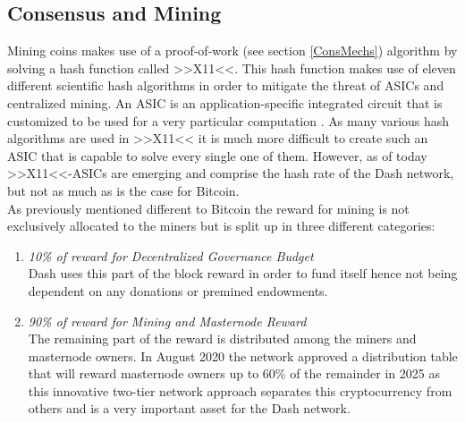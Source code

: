 \documentclass[a4paper,12pt]{report}
\begin{document}
	    \subsection{Consensus and Mining}
	    \startsubsection
	        Mining coins makes use of a proof-of-work (see section \ref{ConsMechs}) algorithm by solving a hash function called >>X11<<. This hash function makes use of eleven different scientific hash algorithms in order to mitigate the threat of ASICs and centralized mining. An ASIC is an application-specific integrated circuit that is customized to be used for a very particular computation \parencite{ASICWiki}. As many various hash algorithms are used in >>X11<< it is much more difficult to create such an ASIC that is capable to solve every single one of them. However, as of today >>X11<<-ASICs are emerging and comprise the hash rate of the Dash network, but not as much as is the case for Bitcoin. \\
	        As previously mentioned different to Bitcoin the reward for mining is not exclusively allocated to the miners but is split up in three different categories:
	        \begin{enumerate}[-]
	            \item \textit{10\% of reward for Decentralized Governance Budget} \\
	            Dash uses this part of the block reward in order to fund itself hence not being dependent on any donations or premined endowments.
	            \item \textit{90\% of reward for Mining and Masternode Reward} \\
	            The remaining part of the reward is distributed among the miners and masternode owners. In August 2020 the network approved a distribution table that will reward masternode owners up to 60\% of the remainder in 2025 as this innovative two-tier network approach separates this cryptocurrency from others and is a very important asset for the Dash network.
	        \end{enumerate}
	    \closesection
\end{document}
